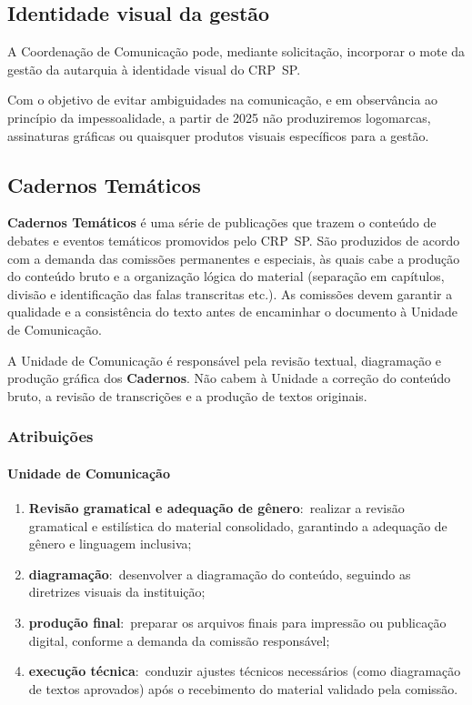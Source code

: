 \subsection{Identidade visual da
  gestão}

A Coordenação de Comunicação pode, mediante solicitação, incorporar o
mote da gestão da autarquia à identidade visual do CRP~SP.

Com o objetivo de evitar ambiguidades na comunicação, e em observância
ao princípio da impessoalidade, a partir de 2025 não produziremos
logomarcas, assinaturas gráficas ou quaisquer produtos visuais
específicos para a gestão.

\subsection{Cadernos Temáticos}

\textbf{Cadernos Temáticos} é uma série de publicações que trazem o
conteúdo de debates e eventos temáticos promovidos pelo CRP~SP. São
produzidos de acordo com a demanda das comissões permanentes e
especiais, às quais cabe a produção do conteúdo bruto e a organização
lógica do material (separação em capítulos, divisão e identificação das
falas transcritas etc.). As comissões devem garantir a qualidade e a
consistência do texto antes de encaminhar o documento à Unidade de
Comunicação.

A Unidade de Comunicação é responsável pela revisão textual, diagramação
e produção gráfica dos \textbf{Cadernos}. Não cabem à Unidade a correção
do conteúdo bruto, a revisão de transcrições e a produção de textos
originais.

\subsubsection{Atribuições}

\paragraph{Unidade de
  Comunicação}

\begin{enumerate}

  \item
        \textbf{Revisão gramatical e adequação de gênero}:~realizar a revisão
        gramatical e estilística do material consolidado, garantindo a
        adequação de gênero e linguagem inclusiva;
  \item
        \textbf{diagramação}:~desenvolver a diagramação do conteúdo, seguindo
        as diretrizes visuais da instituição;
  \item
        \textbf{produção final}:~preparar os arquivos finais para impressão ou
        publicação digital, conforme a demanda da comissão responsável;
  \item
        \textbf{execução técnica}:~conduzir ajustes técnicos necessários (como
        diagramação de textos aprovados) após o recebimento do material
        validado pela comissão.
\end{enumerate}

